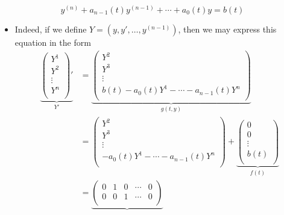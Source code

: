\documentclass[../notes.tex]{subfiles}
\begin{document}
\begin{itemize}
    \begin{equation*}
        y^{(n)}+a_{n-1}(t)y^{(n-1)}+\cdots+a_0(t)y = b(t)
    \end{equation*}
    \begin{itemize}
        \item Indeed, if we define $Y=(y,y',\dots,y^{(n-1)})$, then we may express this equation in the form
        \begin{align*}
            \underbrace{
                \begin{pmatrix}
                    Y^1\\
                    Y^2\\
                    \vdots\\
                    Y^n\\
                \end{pmatrix}'
            }_{Y'}
            &= \underbrace{
                \begin{pmatrix}
                    Y^2\\
                    Y^3\\
                    \vdots\\
                    b(t)-a_0(t)Y^1-\cdots-a_{n-1}(t)Y^n\\
                \end{pmatrix}
            }_{g(t,y)}\\
            &=
            \begin{pmatrix}
                Y^2\\
                Y^3\\
                \vdots\\
                -a_0(t)Y^1-\cdots-a_{n-1}(t)Y^n\\
            \end{pmatrix}
            +\underbrace{
                \begin{pmatrix}
                    0\\
                    0\\
                    \vdots\\
                    b(t)\\
                \end{pmatrix}
            }_{f(t)}\\
            &= \underbrace{
                \begin{pmatrix}
                    0 & 1 & 0 & \cdots & 0\\
                    0 & 0 & 1 & \cdots & 0\\

\end{pmatrix}}
\end{align*}
\end{itemize}
\end{itemize}
\end{document}
